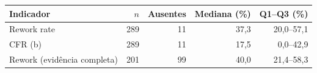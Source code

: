 \begin{tabular}{lrrrr}
\hline
Indicador & $n$ & Ausentes & Mediana (\%) & Q1--Q3 (\%) \\
\hline
Rework rate & 289 & 11 & 37,3 & 20,0--57,1 \\
CFR (b) & 289 & 11 & 17,5 & 0,0--42,9 \\
Rework (evidência completa) & 201 & 99 & 40,0 & 21,4--58,3 \\
\hline
\end{tabular}
